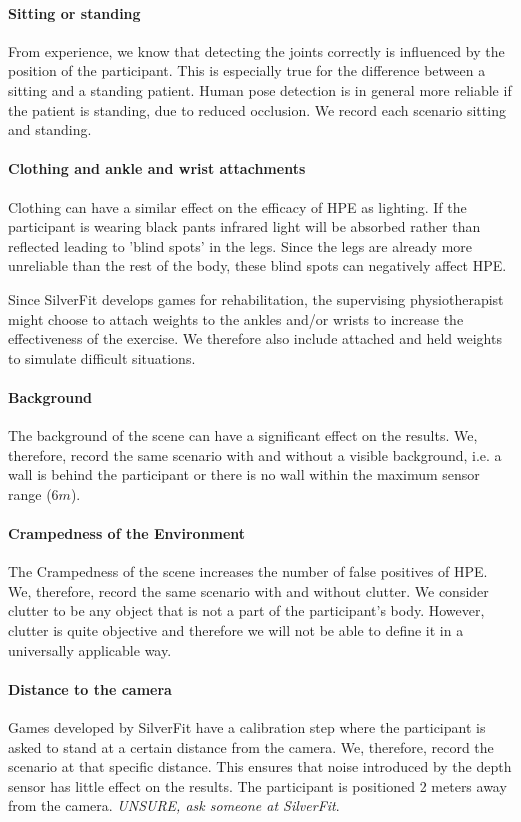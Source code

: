 \paragraph{Sitting or standing}

From experience, we know that detecting the joints correctly is influenced by the position of the participant. This is especially true for the difference between a sitting and a standing patient. Human pose detection is in general more reliable if the patient is standing, due to reduced occlusion. We record each scenario sitting and standing.

\paragraph{Clothing and ankle and wrist attachments}

Clothing can have a similar effect on the efficacy of HPE as lighting. If the participant is wearing black pants infrared light will be absorbed rather than reflected leading to 'blind spots' in the legs. Since the legs are already more unreliable than the rest of the body, these blind spots can negatively affect HPE. 

Since SilverFit develops games for rehabilitation, the supervising physiotherapist might choose to attach weights to the ankles and/or wrists to increase the effectiveness of the exercise. We therefore also include attached and held weights to simulate difficult situations.

\paragraph{Background}

The background of the scene can have a significant effect on the results. We, therefore, record the same scenario with and without a visible background, i.e. a wall is behind the participant or there is no wall within the maximum sensor range ($6m$).

\paragraph{Crampedness of the Environment}

The Crampedness of the scene increases the number of false positives of HPE. We, therefore, record the same scenario with and without clutter. We consider clutter to be any object that is not a part of the participant's body. However, clutter is quite objective and therefore we will not be able to define it in a universally applicable way. 

\paragraph{Distance to the camera}

Games developed by SilverFit have a calibration step where the participant is asked to stand at a certain distance from the camera. We, therefore, record the scenario at that specific distance. This ensures that noise introduced by the depth sensor has little effect on the results. The participant is positioned 2 meters away from the camera. \textit{UNSURE, ask someone at SilverFit}.
